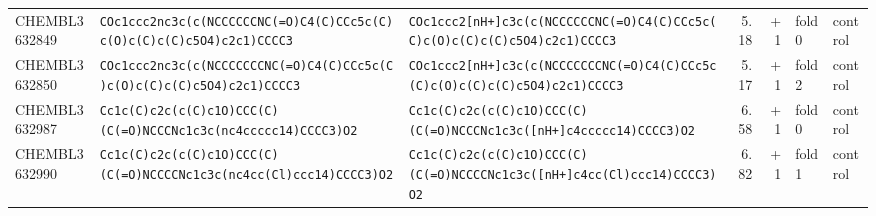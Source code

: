 \begin{longtable}{l p{4.4cm} p{4.4cm} r r l l}
CHEMBL3632849 & \texttt{COc1ccc2nc3c(\allowbreak{}c(\allowbreak{}NCCCCCCNC(\allowbreak{}=\allowbreak{}O)\allowbreak{}C4(\allowbreak{}C)\allowbreak{}CCc5c(\allowbreak{}C)\allowbreak{}c(\allowbreak{}O)\allowbreak{}c(\allowbreak{}C)\allowbreak{}c(\allowbreak{}C)\allowbreak{}c5O4)\allowbreak{}c2c1)\allowbreak{}CCCC3} & \texttt{COc1ccc2[nH+]\allowbreak{}c3c(\allowbreak{}c(\allowbreak{}NCCCCCCNC(\allowbreak{}=\allowbreak{}O)\allowbreak{}C4(\allowbreak{}C)\allowbreak{}CCc5c(\allowbreak{}C)\allowbreak{}c(\allowbreak{}O)\allowbreak{}c(\allowbreak{}C)\allowbreak{}c(\allowbreak{}C)\allowbreak{}c5O4)\allowbreak{}c2c1)\allowbreak{}CCCC3} & 5.18 & +1 & fold 0 & control \\
CHEMBL3632850 & \texttt{COc1ccc2nc3c(\allowbreak{}c(\allowbreak{}NCCCCCCCNC(\allowbreak{}=\allowbreak{}O)\allowbreak{}C4(\allowbreak{}C)\allowbreak{}CCc5c(\allowbreak{}C)\allowbreak{}c(\allowbreak{}O)\allowbreak{}c(\allowbreak{}C)\allowbreak{}c(\allowbreak{}C)\allowbreak{}c5O4)\allowbreak{}c2c1)\allowbreak{}CCCC3} & \texttt{COc1ccc2[nH+]\allowbreak{}c3c(\allowbreak{}c(\allowbreak{}NCCCCCCCNC(\allowbreak{}=\allowbreak{}O)\allowbreak{}C4(\allowbreak{}C)\allowbreak{}CCc5c(\allowbreak{}C)\allowbreak{}c(\allowbreak{}O)\allowbreak{}c(\allowbreak{}C)\allowbreak{}c(\allowbreak{}C)\allowbreak{}c5O4)\allowbreak{}c2c1)\allowbreak{}CCCC3} & 5.17 & +1 & fold 2 & control \\
CHEMBL3632987 & \texttt{Cc1c(\allowbreak{}C)\allowbreak{}c2c(\allowbreak{}c(\allowbreak{}C)\allowbreak{}c1O)\allowbreak{}CCC(\allowbreak{}C)\allowbreak{}(\allowbreak{}C(\allowbreak{}=\allowbreak{}O)\allowbreak{}NCCCNc1c3c(\allowbreak{}nc4ccccc14)\allowbreak{}CCCC3)\allowbreak{}O2} & \texttt{Cc1c(\allowbreak{}C)\allowbreak{}c2c(\allowbreak{}c(\allowbreak{}C)\allowbreak{}c1O)\allowbreak{}CCC(\allowbreak{}C)\allowbreak{}(\allowbreak{}C(\allowbreak{}=\allowbreak{}O)\allowbreak{}NCCCNc1c3c(\allowbreak{}[nH+]\allowbreak{}c4ccccc14)\allowbreak{}CCCC3)\allowbreak{}O2} & 6.58 & +1 & fold 0 & control \\
CHEMBL3632990 & \texttt{Cc1c(\allowbreak{}C)\allowbreak{}c2c(\allowbreak{}c(\allowbreak{}C)\allowbreak{}c1O)\allowbreak{}CCC(\allowbreak{}C)\allowbreak{}(\allowbreak{}C(\allowbreak{}=\allowbreak{}O)\allowbreak{}NCCCCNc1c3c(\allowbreak{}nc4cc(\allowbreak{}Cl)\allowbreak{}ccc14)\allowbreak{}CCCC3)\allowbreak{}O2} & \texttt{Cc1c(\allowbreak{}C)\allowbreak{}c2c(\allowbreak{}c(\allowbreak{}C)\allowbreak{}c1O)\allowbreak{}CCC(\allowbreak{}C)\allowbreak{}(\allowbreak{}C(\allowbreak{}=\allowbreak{}O)\allowbreak{}NCCCCNc1c3c(\allowbreak{}[nH+]\allowbreak{}c4cc(\allowbreak{}Cl)\allowbreak{}ccc14)\allowbreak{}CCCC3)\allowbreak{}O2} & 6.82 & +1 & fold 1 & control \\

\end{longtable}
